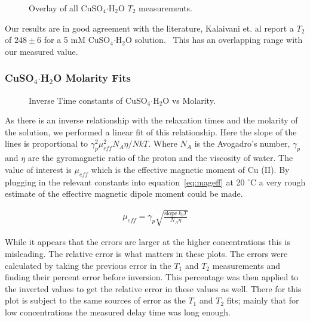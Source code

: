 \documentclass[
reprint,
amsmath,amssymb,
aps,
tikz,
border=5pt
]{revtex4-1}
\newcommand*{\cuso}[1][]{CuSO$_{4} \boldsymbol{\cdot} $H$_2$O }
\newcommand*{\tc}[1][1]{$T_#1$ }
\newcommand*{\tg}[1][2]{$T_#1$ }
\begin{document}
      \begin{figure}[]
        \resizebox{0.45\textwidth}{!}{}
        \caption{Overlay of all \cuso \tg measurements. }
        \label{fig:sumt2}
     \end{figure}

      Our results are in good agreement with the literature, Kalaivani et. al report a \tg of $248 \pm 6$ for a 5 mM \cuso solution.~\cite{THANGAVEL2017} This has an overlapping range with our measured value. 

\subsubsection*{\cuso Molarity Fits}

    \begin{figure}[h]
        \resizebox{0.45\textwidth}{!}{}
        \caption{Inverse Time constants of CuSO$_{4} \boldsymbol{\cdot} $H$_2$O vs Molarity. }
        \label{fig:cu_linear}
    \end{figure}

     As there is an inverse relationship with the relaxation times and the molarity of the solution, we performed a linear fit of this relationship. Here the slope of the lines is proportional to $\gamma^2_p \mu^2_{eff} N_{A} \eta / NkT$. Where $N_{A}$ is the Avogadro's number, $\gamma_p$ and $\eta$ are the gyromagnetic ratio of the proton and the viscosity of water. The value of interest is $\mu_{eff}$ which is the effective magnetic moment of Cu (II). By plugging in the relevant constants into equation~\ref{eq:mageff} at 20 $^\circ$C a very rough estimate of the effective magnetic dipole moment could be made. 


     \begin{gather}
        \mu_{eff} = \gamma_p \sqrt{\frac{\text{slope}~k_b T}{N_A \eta}} \label{eq:mageff}
     \end{gather}

     While it appears that the errors are larger at the higher concentrations this is misleading. The relative error is what matters in these plots. The errors were calculated by taking the previous error in the \tc and \tg measurements and finding their percent error before inversion. This percentage was then applied to the inverted values to get the relative error in these values as well. There for this plot is subject to the same sources of error as the \tc and \tg fits; mainly that for low concentrations the measured delay time was long enough. 
\end{document}
